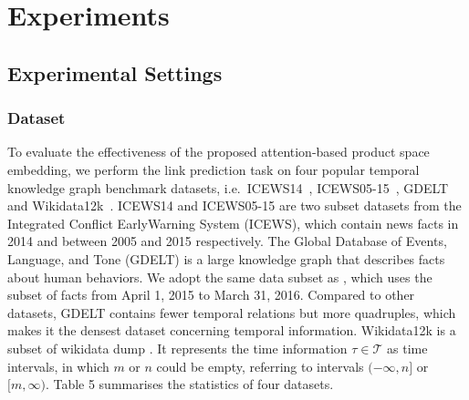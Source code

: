 \documentclass[letterpaper]{article} %
\begin{document}
\section{Experiments}

    

\subsection{Experimental Settings}
\subsubsection{Dataset}
To evaluate the effectiveness of the proposed attention-based product space embedding, 
we perform the link prediction task on four popular temporal knowledge graph benchmark datasets, i.e.\ ICEWS14~\cite{garcia2018learning}, ICEWS05-15~\cite{garcia2018learning}, GDELT~\cite{trivedi2017know} and Wikidata12k~\cite{tcomplexlacroix2020tensor}. ICEWS14 and ICEWS05-15 are two subset datasets from the Integrated Conflict EarlyWarning System (ICEWS)\cite{lautenschlager2015icews}, which contain news facts in 2014 and between 2005 and 2015 respectively. The Global Database of Events, Language, and Tone (GDELT) is a large knowledge graph that describes facts about human behaviors. We adopt the same data subset as \cite{gao2020rotate3d}, which uses the subset of facts from April 1, 2015 to March 31, 2016. Compared to other datasets, GDELT contains fewer temporal relations but more quadruples, which makes it the densest dataset concerning temporal information. Wikidata12k is a subset of wikidata dump \cite{erxleben2014introducing}. It represents the time information $\tau \in \mathcal{T}$ as time intervals, in which $m$ or $n$ could be empty, referring to intervals $(-\infty,n]$ or $[m,\infty)$.  
Table 5 summarises the statistics of four datasets.
\end{document}
